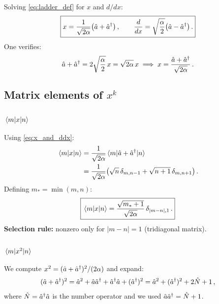Solving \cref{eq:ladder_def} for $x$ and $d/dx$:
\begin{equation}\label{eq:x_and_ddx}
  \boxed{x = \frac{1}{\sqrt{2\alpha}}\bigl(\hat{a} + \hat{a}^{\dagger}\bigr)\,,\qquad
  \frac{d}{dx} = \sqrt{\frac{\alpha}{2}}\bigl(\hat{a} - \hat{a}^{\dagger}\bigr)\,.}
\end{equation}
One verifies:
\begin{equation}
  \hat{a} + \hat{a}^{\dagger} = 2\sqrt{\frac{\alpha}{2}}\,x = \sqrt{2\alpha}\,x \implies x = \frac{\hat{a}+\hat{a}^{\dagger}}{\sqrt{2\alpha}}\,.
\end{equation}

\subsection{Matrix elements of $x^k$}\label{sec:HO_matrix_elements}

\subsubsection{$\mel{m}{x}{n}$}

Using \cref{eq:x_and_ddx}:
\begin{align}
  \mel{m}{x}{n}
  &= \frac{1}{\sqrt{2\alpha}}\mel{m}{\hat{a}+\hat{a}^{\dagger}}{n}\notag\\
  &= \frac{1}{\sqrt{2\alpha}}\bigl(\sqrt{n}\,\delta_{m,n-1} + \sqrt{n+1}\,\delta_{m,n+1}\bigr)\,.
\end{align}
Defining $m_* = \min(m,n)$:
\begin{equation}\label{eq:x1_HO}
  \boxed{\mel{m}{x}{n} = \frac{\sqrt{m_*+1}}{\sqrt{2\alpha}}\,\delta_{|m-n|,1}\,.}
\end{equation}
\textbf{Selection rule:} nonzero only for $|m-n| = 1$ (tridiagonal matrix).

\subsubsection{$\mel{m}{x^2}{n}$}

We compute $x^2 = (\hat{a}+\hat{a}^{\dagger})^2/(2\alpha)$ and expand:
\begin{equation}
  (\hat{a}+\hat{a}^{\dagger})^2 = \hat{a}^2 + \hat{a}\hat{a}^{\dagger} + \hat{a}^{\dagger}\hat{a} + (\hat{a}^{\dagger})^2
  = \hat{a}^2 + (\hat{a}^{\dagger})^2 + 2\hat{N} + 1\,,
\end{equation}
where $\hat{N} = \hat{a}^{\dagger}\hat{a}$ is the number operator and we used $\hat{a}\hat{a}^{\dagger} = \hat{N} + 1$.

